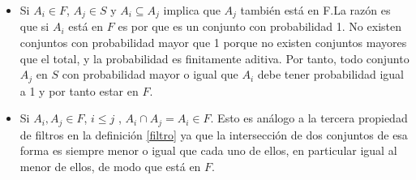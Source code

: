 \begin{problem}
\begin{itemize}
\item Si $A_i \in F$, $A_j \in S$ y $A_i\subseteq A_j$ implica que $A_j$ también está en F.\newline La razón es que si $A_i$ está en $F$ es por que es un conjunto con probabilidad 1. No existen conjuntos con probabilidad mayor que 1 porque no existen conjuntos mayores que el total, y la probabilidad es finitamente aditiva. Por tanto, todo conjunto $A_j$ en $S$ con probabilidad mayor o igual que $A_i$ debe tener probabilidad igual a 1 y por tanto estar en $F$.
\item Si $A_i, A_j \in F$, $i \leq j$ , $A_i \cap A_j = A_i \in F$. \newline Esto es análogo a la tercera propiedad de filtros en la definición \ref{filtro} ya que la intersección de dos conjuntos de esa forma es siempre menor o igual que cada uno de ellos, en particular igual al menor de ellos, de modo que está en $F$.
\end{itemize}


\end{problem}

